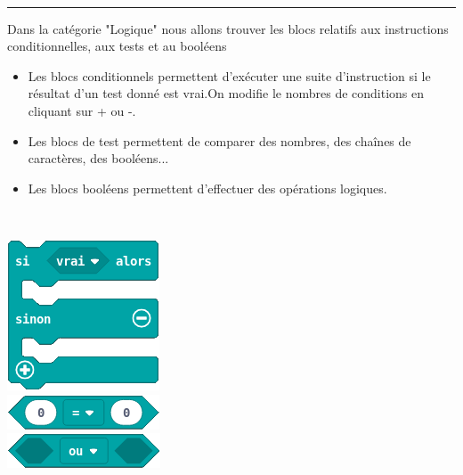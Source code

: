 
\begin{minipage}[t]{0.75\linewidth}

    \begin{blocLogique}\\
      \rule{-0.25em}{2em}
      Dans la catégorie "Logique" nous allons trouver les blocs relatifs aux instructions conditionnelles, aux tests et au booléens\\

      \begin{itemize}
        \item Les blocs conditionnels permettent d'exécuter une suite d'instruction si le résultat d'un test donné est vrai.On modifie le nombres de conditions en cliquant sur + ou -.
        \item Les blocs de test permettent de comparer des nombres, des chaînes de caractères, des booléens...
        \item Les blocs booléens permettent d'effectuer des opérations logiques.
      \end{itemize}

    \end{blocLogique}

\end{minipage}
\hfill
\begin{minipage}[t]{0.25\linewidth}~\\
  \vspace{5mm}

    \includegraphics[scale=0.4]{res/blocsMkCd/MB_makecode_logique-sisinon.png}\\[0.5em]
    \includegraphics[scale=0.4]{res/blocsMkCd/MB_makecode_logique-test.png}\\[0.5em]
    \includegraphics[scale=0.4]{res/blocsMkCd/MB_makecode_logique-bool.png}

\end{minipage}

